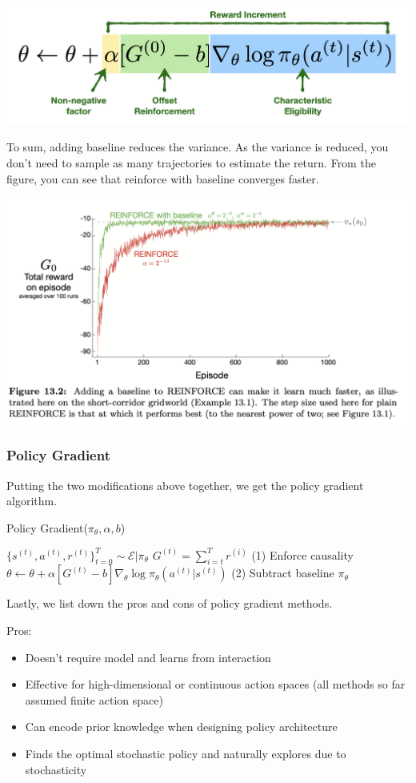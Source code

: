 \documentclass[11pt]{article}
\begin{document}
\begin{center}
    \includegraphics[width=.5\linewidth]{images/Reinforce.png}
\end{center}

To sum, adding baseline reduces the variance. As the variance is reduced, you don't need to sample as many trajectories to estimate the return. From the figure\cite{sutton2018reinforcement}, you can see that reinforce with baseline converges faster.

\begin{center}
    \includegraphics[width=.5\linewidth]{images/Reinforce_baseline.png}
\end{center}

\subsubsection{Policy Gradient}
Putting the two modifications above together, we get the policy gradient algorithm.
\begin{algorithm}[H]
\caption{Policy Gradient($\pi_\theta, \alpha, b$)}
\begin{algorithmic}[1]
\STATE $\{s^{(t)}, a^{(t)}, r^{(t)}\}_{t=0}^T \sim \mathcal{E}|\pi_\theta$
\STATE $G^{(t)} = \sum_{i=t}^T r^{(i)}$  \hfill (1) Enforce causality
\STATE $\theta \leftarrow \theta + \alpha [G^{(t)}-b] \nabla_\theta \log \pi_\theta (a^{(t)}|s^{(t)}) $ \hfill (2) Subtract baseline
\ENDFOR
\ENDFOR
\RETURN $\pi_\theta$
\end{algorithmic}
\end{algorithm}

Lastly, we list down the pros and cons of policy gradient methods.

Pros:
\begin{itemize}
    \item Doesn't require model and learns from interaction
    \item Effective for high-dimensional or continuous action spaces (all methods so far assumed finite action space)
    \item Can encode prior knowledge when designing policy architecture
    \item Finds the optimal stochastic policy and naturally explores due to stochasticity
\end{itemize}
\end{document}

